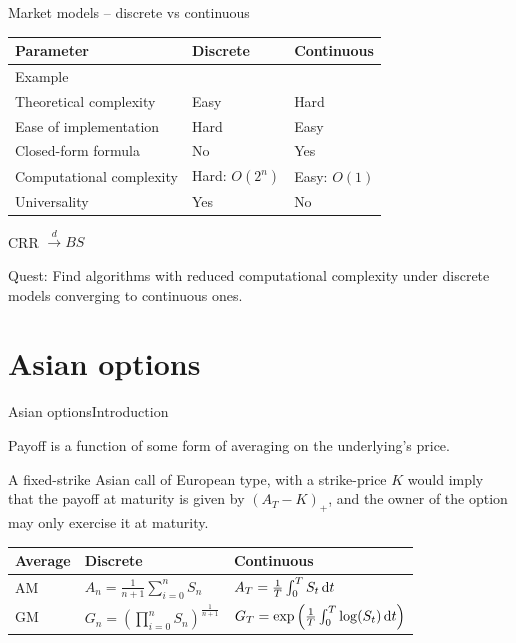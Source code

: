 \documentclass[utf8,t,compress,xcolor=svgnames,handout]{beamer}
\begin{document}
	
	\begin{frame}{Market models -- discrete vs continuous}
		\begin{tabular}{lll}
			\toprule
			Parameter  &  Discrete  &  Continuous  \\
			\midrule
			Example  &  \cite{Cox1979}  &  \cite{Black1973}  \\
			Theoretical complexity  &  Easy  &  Hard  \\
			Ease of implementation  &  Hard  &  Easy  \\
			Closed-form formula  &  No\footnotemark  &  Yes  \\
			Computational complexity  &  Hard: $ O(2^n) $\footnotemark[1]  &  Easy: $ O(1) $  \\
			Universality  &  Yes  &  No  \\
			\bottomrule
		\end{tabular}
		
		\begin{theorem}
			CRR $ \xrightarrow{d} BS $
		\end{theorem}
		
		\alert{Quest}: Find algorithms with reduced computational complexity under discrete models converging to continuous ones.
	\end{frame}
	
	
	
	\section{Asian options}
	
	
	\begin{frame}{Asian options}{Introduction}
		\begin{definition}
			Payoff is a function of some form of averaging on the underlying's price.
		\end{definition}
		
		\begin{example}
			A fixed-strike Asian call of European type, with a strike-price $ K $ would imply that the payoff at maturity is given by $ (A_T - K)_+ $, and the owner of the option may only exercise it at maturity.
		\end{example}
		
		\begin{tabular}{lll}
			\toprule
			Average  &  Discrete  &  Continuous  \\
			\midrule
			AM  &  $ A_n = \frac{1}{n+1} \sum_{i=0}^{n} S_n $  &  $ A_T = \frac{1}{T} \int_{0}^{T} S_t \dif t $  \\
			GM  &  $ G_n = \left( \prod_{i=0}^{n} S_n \right)^{\frac{1}{n+1}} $  &  $  
			G_T = \exp \left(  \frac{1}{T} \int_{0}^{T} \log(S_t) \dif t  \right) $  \\
			\bottomrule
		\end{tabular}
		
	\end{frame}
	
\end{document}
